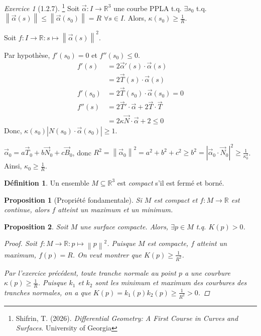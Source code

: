 \documentclass{report}
\newtheorem*{prop}{Proposition}
\theoremstyle{definition}
\newtheorem*{dfn}{D\'efinition}
\theoremstyle{remark}
\newtheorem*{exer}{Exercice}
\def\lte{\leqslant}
\def\gte{\geqslant}
\def\RR{\mathbb{R}}
\newcommand*{\abs}[1]{\left|#1\right|}
\newcommand*{\norme}[1]{\left\|#1\right\|}
\begin{document}
	\begin{exer}[1.2.7]\footnote{Shifrin, T. (2026). \textit{Differential Geometry: A First Course in Curves and Surfaces}. University of Georgia}
		Soit $\vec\alpha:I\to\RR^3$ une courbe PPLA t.q. $\exists s_0$ t.q. $\norme{\vec\alpha(s)} \lte \norme{\vec\alpha(s_0)} = R$ $\forall s\in I$. Alors, $\kappa(s_0) \gte \frac{1}{R}$.

		Soit $f : I\to\RR : s\mapsto\norme{\vec\alpha(s)}^2$.

		Par hypoth\`ese, $f'(s_0)=0$ et $f''(s_0)\lte0$.
		\begin{align*}
			f'(s)&= 2\vec\alpha'(s)\cdot\vec\alpha(s)\\
			&= 2\vec T(s)\cdot\vec\alpha(s)\\[1ex]
			f'(s_0)&= 2\vec T(s_0)\cdot\vec\alpha(s_0)=0\\[2ex]
			f''(s)&= 2\vec T'\cdot\vec\alpha+2\vec T\cdot\vec T\\
			&= 2\kappa\vec N\cdot\vec\alpha+2\lte0
		\end{align*}
		Donc, $\kappa(s_0)\abs{N(s_0)\cdot\vec\alpha(s_0)}\gte1$.

		$\vec\alpha_0=a\vec T_0+b\vec N_0+c\vec B_0$, donc $R^2 = \norme{\vec\alpha_0}^2 = a^2+b^2+c^2 \gte b^2 = \abs{\vec\alpha_0\cdot\vec N_0}^2 \gte \frac{1}{\kappa_0^2}$. Ainsi, $\kappa_0\gte\frac{1}{R}$.
	\end{exer}

	\begin{dfn}
		Un ensemble $M\subseteq\RR^3$ est \emph{compact} s'il est ferm\'e et born\'e.
	\end{dfn}

	\begin{prop}[Propri\'et\'e fondamentale]
		Si $M$ est compact et $f:M\to\RR$ est continue, alors $f$ atteint un maximum et un minimum.
	\end{prop}

	\begin{prop}
		Soit $M$ une surface compacte. Alors, $\exists p\in M$ t.q. $K(p)>0$.
		\begin{proof}
			Soit $f : M\to\RR : p\mapsto\norme{p}^2$. Puisque $M$ est compacte, $f$ atteint un maximum, $f(p)=R$. On veut montrer que $K(p) \gte \frac{1}{R^2}$.

			Par l'exercice pr\'ec\'edent, toute tranche normale au point $p$ a une courbure $\kappa(p) \gte \frac{1}{R}$. Puisque $k_1$ et $k_2$ sont les minimum et maximum des courbures des tranches normales, on a que $K(p) = k_1(p)k_2(p) \gte \frac{1}{R^2} > 0$.
		\end{proof}
	\end{prop}
\end{document}
